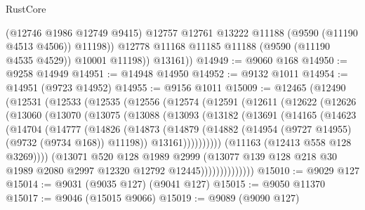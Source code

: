 \begin{lexlean}{RustCore}
\begin{coremodule}
                (@12746 @1986 @12749 @9415)
                @12757
                @12761
                @13222
                @11188
                (@9590 (@11190 @4513 @4506))
                @11198))
            @12778
            @11168
            @11185
            @11188
            (@9590 (@11190 @4535 @4529))
            @10001
            @11198))
        @13161))
@14949 := @9060 @168
@14950 := @9258 @14949
@14951 := @14948 @14950
@14952 := @9132 @1011
@14954 := @14951 (@9723 @14952)
@14955 := @9156 @1011
@15009 := @12465
    (@12490
      (@12531
        (@12533
          (@12535
            (@12556
              (@12574
                (@12591
                  (@12611
                    (@12622
                      (@12626
                        (@13060
                          (@13070
                            (@13075
                              (@13088
                                (@13093
                                  (@13182
                                    (@13691
                                      (@14165
                                        (@14623
                                          (@14704
                                            (@14777
                                              (@14826
                                                (@14873
                                                  (@14879
                                                    (@14882
                                                      (@14954
                                                        (@9727 @14955)
                                                        (@9732 (@9734 @168))
                                                        @11198))
                                                    @13161))))))))))
                                (@11163 (@12413 @558 @128 @3269))))
                            (@13071
                              @520
                              @128
                              @1989
                              @2999
                              (@13077
                                @139
                                @128
                                @218
                                @30
                                @1989
                                @2080
                                @2997
                                @12320
                                @12792
                                @12445))))))))))))))
@15010 := @9029 @127
@15014 := @9031 (@9035 @127) (@9041 @127)
@15015 := @9050 @11370
@15017 := @9046 (@15015 @9066)
@15019 := @9089 (@9090 @127)

\end{coremodule}
\end{lexlean}
